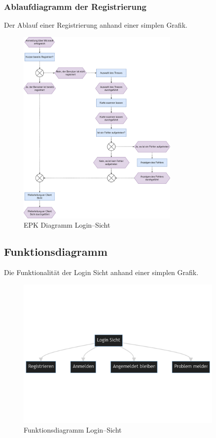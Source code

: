 {\newpage

\subsubsection{Ablaufdiagramm der Registrierung}
Der Ablauf einer Registrierung anhand einer simplen Grafik.
\begin{figure}[h!]
\centering
\includegraphics[width=0.7\textwidth]{FLUTTER/images/GP/LoginAblaufAllgEPK.png}
\caption{EPK Diagramm Login–Sicht}
\end{figure}


\newpage
\subsection{Funktionsdiagramm}
Die Funktionalit\"at der Login Sicht anhand einer simplen Grafik.
\begin{figure}[h!]
\centering
\includegraphics[width=0.9\textwidth]{FLUTTER/images/GP/login_funktion.png}
\caption{Funktionsdiagramm Login–Sicht}
\end{figure}
\newpage

}
